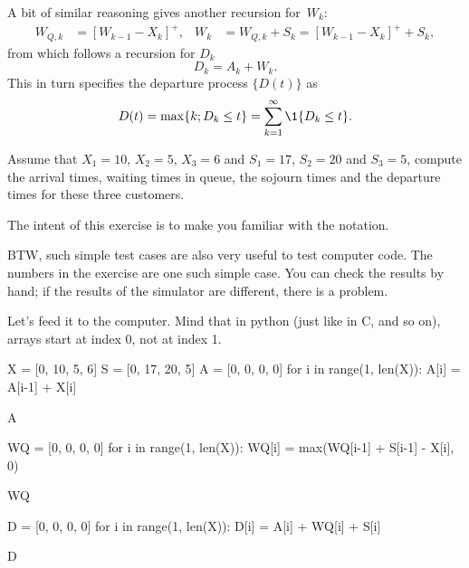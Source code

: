 A bit of similar reasoning gives another recursion for~$W_k$:
\begin{align}
  \label{eq:59}
  W_{Q,k} &= [W_{k-1} - X_k]^+, &
  W_{k} &= W_{Q,k} + S_k = [W_{k-1} - X_k]^+ + S_k,
\end{align}
from which follows a recursion for $D_k$
\begin{equation}
  D_k = A_k + W_k.
\end{equation}
This in turn specifies the departure process $\{D(t)\}$ as
\begin{equation*}
  D(t) = \max\{k; D_k \leq t\} = \sum_{k=1}^\infty \1{D_k \leq t}.
\end{equation*}

\begin{exercise}
 Assume that $X_1=10$, $X_2=5$, $X_3=6$ and $S_1 = 17$,
    $S_2=20$ and $S_3=5$, compute the arrival times, waiting times in
    queue, the sojourn times and the departure times for these three
    customers.
  \begin{hint}
     The intent of this exercise is
      to make you familiar with the notation.

      BTW, such simple test cases are also very useful to test
      computer code. The numbers in the exercise are one such simple
      case. You can check the results by hand; if the results of the
      simulator are different, there is a problem.
    \end{hint}
    \begin{solution} Let's feed it to the computer. Mind that in python (just like in C, and so on), arrays start at index 0, not at index 1. 
\begin{pyconsole}
X = [0, 10, 5, 6] 
S = [0, 17, 20, 5]
A = [0, 0, 0, 0]
for i in range(1, len(X)):
    A[i] = A[i-1] + X[i]

A

WQ = [0, 0, 0, 0]
for i in range(1, len(X)):
    WQ[i] = max(WQ[i-1] + S[i-1] - X[i], 0)

WQ

D = [0, 0, 0, 0]
for i in range(1, len(X)):
    D[i] = A[i] + WQ[i] + S[i]

D
\end{pyconsole}
      
    \end{solution}
  \end{exercise}

